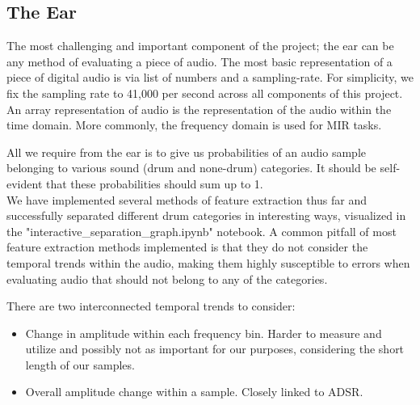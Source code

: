 \documentclass{nime-alternate} %
\begin{document}
\subsection{The Ear}
The most challenging and important component of the project; the ear can be any method of evaluating a piece of audio. The most basic representation of a piece of digital audio is via list of numbers and a sampling-rate. For simplicity, we fix the sampling rate to 41,000 per second across all components of this project. An array representation of audio is the representation of the audio within the time domain. More commonly, the frequency domain is used for MIR tasks.

All we require from the ear is to give us probabilities of an audio sample belonging to various sound (drum and none-drum) categories. It should be self-evident that these probabilities should sum up to 1.\\

We have implemented several methods of feature extraction thus far and successfully separated different drum categories in interesting ways, visualized in the "interactive\_separation\_graph.ipynb" notebook. A common pitfall of most feature extraction methods implemented is that they do not consider the temporal trends within the audio, making them highly susceptible to errors when evaluating audio that should not belong to any of the categories.\\

There are two interconnected temporal trends to consider: 
\begin{itemize}
    \item Change in amplitude within each frequency bin. Harder to measure and utilize and possibly not as important for our purposes, considering the short length of our samples.
    \item Overall amplitude change within a sample. Closely linked to ADSR. 
\end{itemize}{}
\end{document}
